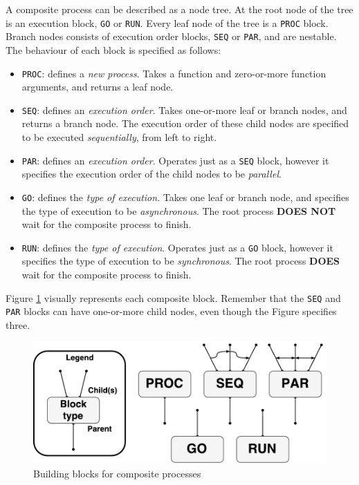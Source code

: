 A composite process can be described as a node tree. At the root node of the tree is an execution block, \texttt{GO} or \texttt{RUN}. Every leaf node of the tree is a \texttt{PROC} block. Branch nodes consists of execution order blocks, \texttt{SEQ} or \texttt{PAR}, and are nestable. The behaviour of each block is specified as follows:
\begin{itemize}
    \setlength\itemsep{0em}
    \item \texttt{PROC}: defines a \textit{new process}. Takes a function and zero\hyp{}or\hyp{}more function arguments, and returns a leaf node. 
    
    \item \texttt{SEQ}: defines an \textit{execution order}. Takes one\hyp{}or\hyp{}more leaf or branch nodes, and returns a branch node. The execution order of these child nodes are specified to be executed \textit{sequentially}, from left to right. 
    
    \item \texttt{PAR}: defines an \textit{execution order}. Operates just as a \texttt{SEQ} block, however it specifies the execution order of the child nodes to be \textit{parallel}. 
    
    \item \texttt{GO}: defines the \textit{type of execution}. Takes one leaf or branch node, and specifies the type of execution to be \textit{asynchronous}. The root process \textbf{DOES NOT} wait for the composite process to finish.
    
    \item \texttt{RUN}: defines the \textit{type of execution}. Operates just as a \texttt{GO} block, however it specifies the type of execution to be \textit{synchronous}. The root process \textbf{DOES} wait for the composite process to finish.
\end{itemize}

Figure \ref{fig:composite_blocks} visually represents each composite block. Remember that the \texttt{SEQ} and \texttt{PAR} blocks can have one\hyp{}or\hyp{}more child nodes, even though the Figure specifies three. 

\FloatBarrier

\begin{figure}[h]
    \centering
    \includegraphics[width=0.8\linewidth]{fig/csp}
    \caption{Building blocks for composite processes}
    \label{fig:composite_blocks}
\end{figure}

